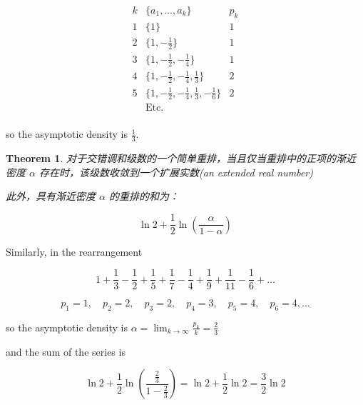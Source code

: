 \documentclass{ctexart}
\newtheorem{theorem}{Theorem}
\begin{document}
\[
\begin{array}{c|c|c}
k & \{a_1, \dots, a_k\} & p_k \\
\hline
1 & \{1\} & 1 \\
2 & \{1, -\frac{1}{2}\} & 1 \\
3 & \{1, -\frac{1}{2}, -\frac{1}{4}\} & 1 \\
4 & \{1, -\frac{1}{2}, -\frac{1}{4}, \frac{1}{3}\} & 2 \\
5 & \{1, -\frac{1}{2}, -\frac{1}{4}, \frac{1}{3}, -\frac{1}{6}\} & 2 \\
  & \text{Etc.}  & \\
\end{array}
\]

so the asymptotic density is \(\frac{1}{3}\).

\begin{theorem}
对于交错调和级数的一个简单重排，当且仅当重排中的正项的渐近密度 \(\alpha\) 存在时，该级数收敛到一个扩展实数(an extended real number)

此外，具有渐近密度 \(\alpha\) 的重排的和为：

\[
\ln 2 + \frac{1}{2} \ln \left(\frac{\alpha}{1 - \alpha}\right)
\]
\end{theorem}

Similarly, in the rearrangement

\[
1 + \frac{1}{3} - \frac{1}{2} + \frac{1}{5} + \frac{1}{7} - \frac{1}{4} + \frac{1}{9} + \frac{1}{11} - \frac{1}{6} + \dots
\]

\[
p_1 = 1, \quad p_2 = 2, \quad p_3 = 2, \quad p_4 = 3, \quad p_5 = 4, \quad p_6 = 4, \dots
\]

so the asymptotic density is \(\alpha = \lim_{k \to \infty} \frac{p_k}{k} = \frac{2}{3}\)

and the sum of the series is

\[
\ln 2 + \frac{1}{2} \ln \left(\frac{\frac{2}{3}}{1 - \frac{2}{3}}\right) = \ln 2 + \frac{1}{2} \ln 2 = \frac{3}{2} \ln 2
\]
\end{document}
